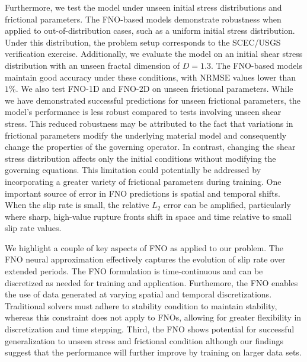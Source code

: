 \documentclass[draft]{agujournal2019}
\begin{document}
Furthermore, we test the model under unseen initial stress distributions and frictional parameters. The FNO-based models demonstrate robustness when applied to out-of-distribution cases, such as a uniform initial stress distribution. Under this distribution, the problem setup corresponds to the SCEC/USGS verification exercise. Additionally, we evaluate the model on an initial shear stress distribution with an unseen fractal dimension of \(D=1.3\). The FNO-based models maintain good accuracy under these conditions, with NRMSE values lower than \(1 \%\). We also test FNO-1D and FNO-2D on unseen frictional parameters. While we have demonstrated successful predictions for unseen frictional parameters, the model's performance is less robust compared to tests involving unseen shear stress. This reduced robustness may be attributed to the fact that variations in frictional parameters modify the underlying material model and consequently change the properties of the governing operator. In contrast, changing the shear stress distribution affects only the initial conditions without modifying the governing equations. This limitation could potentially be addressed by incorporating a greater variety of frictional parameters during training. One important source of error in FNO predictions is spatial and temporal shifts. When the slip rate is small, the relative \(L_2\) error can be amplified, particularly where sharp, high-value rupture fronts shift in space and time relative to small slip rate values.

We highlight a couple of key aspects of FNO as applied to our problem. The FNO neural approximation effectively captures the evolution of slip rate over extended periods. The FNO formulation is time-continuous and can be discretized as needed for training and application. Furthemore, the FNO enables the use of data generated at varying spatial and temporal discretizations. Traditional solvers must adhere to stability condition to maintain stability, whereas this constraint does not apply to FNOs, allowing for greater flexibility in discretization and time stepping. Third, the FNO shows potential for successful generalization to unseen stress and frictional condition although our findings suggest that the performance will further improve by training on larger data sets.
\end{document}
